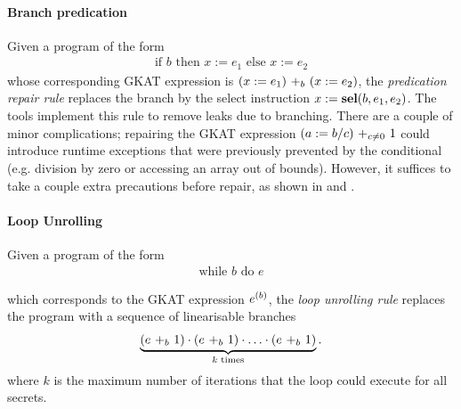 \paragraph*{Branch predication} Given a program of the form 
\begin{align*}
    \text{if $b$ then $x:=e_1$ else $x:=e_2$}
\end{align*}
whose corresponding GKAT expression is $\branch{b}{(x:=e_1)}{(x:=e_2)}$, the \emph{predication repair rule} replaces the branch by the select instruction $x:=\sel(b,e_1,e_2)$. The tools \cite{Racoon,SCEliminator,MSESC} implement this rule to remove leaks due to branching.
There are a couple of minor complications; repairing the GKAT expression $\branch{c\neq0}{(a:=b/c)}{1}$
could introduce runtime exceptions that were previously prevented by the conditional (e.g. division by zero or accessing an array out of bounds). However, it suffices to take a couple extra precautions before repair, as shown in \cite{Racoon} and \cite{MSESC}. 



% 

\paragraph*{Loop Unrolling} Given a program of the form 
\begin{align*}
    \text{while $b$ do $e$}
\end{align*}
    
which corresponds to the GKAT expression $\iteration{b}{e}$, the \emph{loop unrolling rule} replaces the program with a sequence of linearisable branches 
\begin{align*}
    \underbrace{\left(\branch{b}{e}{1}\right)\cdot\left(\branch{b}{e}{1}\right)\cdot\ldots\cdot\left(\branch{b}{e}{1}\right)}_\text{$k$ times}.
    \end{align*}
where $k$ is the maximum number of iterations that the loop could execute for all secrets. 

